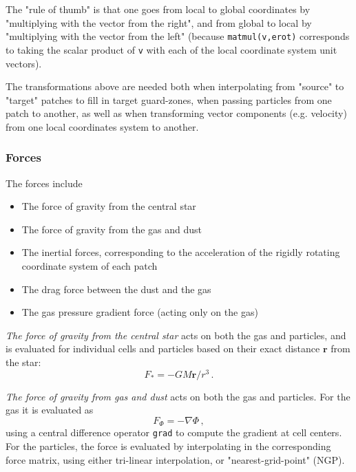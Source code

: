 \documentclass[paper=a4,fontsize=11pt]{scrartcl}
\numberwithin{equation}{section}		%
\numberwithin{figure}{section}			%
\numberwithin{table}{section}				%
\newcommand{\codecolor}{\color{Blue}}
\newcommand{\Code}[1]{{\codecolor\texttt{#1}}}
\begin{document}
The "rule of thumb" is that one goes from local to global coordinates by "multiplying with the vector from the right", and from global to local by "multiplying with the vector from the left" (because \Code{matmul(v,erot)} corresponds to taking the scalar product of \Code{v} with each of the local coordinate system unit vectors).

The transformations above are needed both when interpolating from "source" to "target" patches to fill in target guard-zones, when passing particles from one patch to another, as well as when transforming vector components (e.g. velocity) from one local coordinates system to another.

\subsubsection{Forces}
The forces include
\begin{itemize}
    \item The force of gravity from the central star
    \item The force of gravity from the gas and dust
    \item The inertial forces, corresponding to the acceleration of the rigidly rotating coordinate system of each patch
    \item The drag force between the dust and the gas
    \item The gas pressure gradient force (acting only on the gas)
\end{itemize}

\textit{The force of gravity from the central star} acts on both the gas and particles, and is evaluated for individual cells and particles based on their exact distance $\mathbf{r}$ from the star:
\def\rr{\mathbf{r}}
\begin{equation}
    F_* = - G M \rr/r^3 \,.
\end{equation}

\textit{The force of gravity from gas and dust} acts on both the gas and particles. For the gas it is evaluated as
\begin{equation}
    F_{\Phi} = -\nabla \Phi \,,
\end{equation}
using a central difference operator \Code{grad} to compute the gradient at cell centers.  For the particles, the force is evaluated by interpolating in the corresponding force matrix, using either tri-linear interpolation, or "nearest-grid-point" (NGP).
\end{document}
